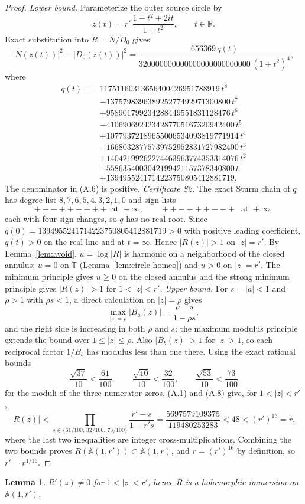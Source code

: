 \documentclass[11pt,reqno]{amsart}
\newtheorem{lemma}[theorem]{Lemma}
\theoremstyle{definition}
\theoremstyle{remark}
\begin{document}
\begin{proof}
\emph{Lower bound.} Parameterize the outer source circle by
\[ z(t)=r'\,\frac{1-t^2+2it}{1+t^2},\qquad t\in\mathbb R. \]
Exact substitution into \(R=N/D_0\) gives
\[ |N(z(t))|^2-|D_0(z(t))|^2=\frac{656369\,q(t)}{320000000000000000000000000\,(1+t^2)^4}, \tag{A.6} \]
where
\[\begin{aligned} q(t)={}&11751160313656400426951788919\,t^{8}\\ &-137579839638925277492971300800\,t^{7}\\ &+958901799234288449551831128476\,t^{6}\\ &-4106906924234287705167320942400\,t^{5}\\ &+10779372189655006534093819771914\,t^{4}\\ &-16680328775739752952831727982400\,t^{3}\\ &+14042199262274463963774353314076\,t^{2}\\ &-5586354003042199421157378340800\,t\\ &+1394955241714223750805412881719. \end{aligned}\tag{A.7}\]
The denominator in (A.6) is positive. \emph{Certificate S2.} The exact Sturm chain of \(q\) has degree list \(8,7,6,5,4,3,2,1,0\) and sign lists
\[ +--++--++\ \text{ at } -\infty,\qquad ++--++--+\ \text{ at } +\infty, \]
each with four sign changes, so \(q\) has no real root. Since \(q(0)=1394955241714223750805412881719>0\) with positive leading coefficient, \(q(t)>0\) on the real line and at \(t=\infty\). Hence \(|R(z)|>1\) on \(|z|=r'\).
By Lemma~\ref{lem:avoid}, \(u=\log|R|\) is harmonic on a neighborhood of the closed annulus; \(u=0\) on \(\mathbb T\) (Lemma~\ref{lem:circle-homeo}) and \(u>0\) on \(|z|=r'\). The minimum principle gives \(u\ge0\) on the closed annulus and the strong minimum principle gives \(|R(z)|>1\) for \(1<|z|<r'\).
\emph{Upper bound.} For \(s=|a|<1\) and \(\rho>1\) with \(\rho s<1\), a direct calculation on \(|z|=\rho\) gives
\[ \max_{|z|=\rho}|B_a(z)|=\frac{\rho-s}{1-\rho s}, \tag{A.8} \]
and the right side is increasing in both \(\rho\) and \(s\); the maximum modulus principle extends the bound over \(1\le|z|\le\rho\). Also \(|B_b(z)|>1\) for \(|z|>1\), so each reciprocal factor \(1/B_b\) has modulus less than one there. Using the exact rational bounds
\[ \frac{\sqrt{37}}{10}<\frac{61}{100},\qquad \frac{\sqrt{10}}{10}<\frac{32}{100},\qquad \frac{\sqrt{53}}{10}<\frac{73}{100} \]
for the moduli of the three numerator zeros, (A.1) and (A.8) give, for \(1<|z|<r'\),
\[ |R(z)|<\prod_{s\in\{61/100,\,32/100,\,73/100\}}\frac{r'-s}{1-r's}=\frac{5697579109375}{119480253283}<48<(r')^{16}=r, \]
where the last two inequalities are integer cross-multiplications. Combining the two bounds proves \(R(\mathbb A(1,r'))\subset\mathbb A(1,r)\), and \(r=(r')^{16}\) by definition, so \(r'=r^{1/16}\).
\end{proof}
\begin{lemma}\label{lem:immersion}
\(R'(z)\ne0\) for \(1<|z|<r'\); hence \(R\) is a holomorphic immersion on \(\mathbb A(1,r')\).
\end{lemma}
\end{document}
